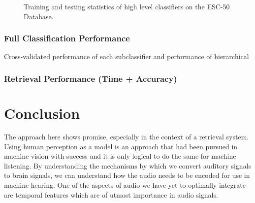 \begin{figure}
    \centering
    \hfill
    \caption{Training and testing statistics of high level classifiers on the ESC-50 Database.}
\end{figure}

\subsubsection{Full Classification Performance}

Cross-validated performance of each subclassifier and performance of hierarchical

\subsubsection{Retrieval Performance (Time + Accuracy)}


\section{Conclusion}
The approach here shows promise, especially in the context of a retrieval
system. Using human perception as a model is an approach that had been pursued
in machine vision with success and it is only logical to do the same for machine
listening. By understanding the mechanisms by which we convert auditory signals
to brain signals, we can understand how the audio needs to be encoded for use in
machine hearing. One of the aspects of audio we have yet to optimally integrate
are temporal features which are of utmost importance in audio signals.

